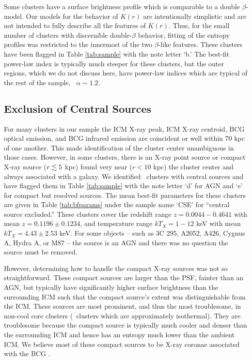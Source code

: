 \documentclass[12pt,preprint]{aastex}
\begin{document}
Some clusters have a surface brightness profile which is comparable to
a double $\beta$-model. Our models for the behavior of $K(r)$ are
intentionally simplistic and are not intended to fully describe all
the features of $K(r)$. Thus, for the small number of clusters with
discernible double-$\beta$ behavior, fitting of the entropy profiles
was restricted to the innermost of the two $\beta$-like
features. These clusters have been flagged in Table \ref{tab:sample}
with the note letter `b.' The best-fit power-law index is typically
much steeper for these clusters, but the outer regions, which we do
not discuss here, have power-law indices which are typical of the rest
of the sample, \ie\ $\alpha \sim 1.2$.


\subsection{Exclusion of Central Sources}
\label{sec:centsrc}

For many clusters in our sample the ICM X-ray peak, ICM X-ray
centroid, BCG optical emission, and BCG infrared emission are
coincident or well within 70 kpc of one another. This made
identification of the cluster center unambiguous in those
cases. However, in some clusters, there is an X-ray point source or
compact X-ray source ($r \lesssim 5$ kpc) found very near ($r < 10$ kpc)
the cluster center and always associated with a galaxy. We identified
\centsrcnum\ clusters with central sources and have flagged them in
Table \ref{tab:sample} with the note letter `d' for AGN and `e' for
compact but resolved sources. The mean best-fit parameters for these
clusters are given in Table \ref{tab:bfparams} under the sample name
`CSE' for ``central source excluded.'' These clusters cover the
redshift range $z = 0.0044-0.4641$ with mean $z = 0.1196 \pm 0.1234$,
and temperature range $kT_X = 1-12$ keV with mean $kT_X = 4.43 \pm
2.53$ keV. For some objects -- such as 3C 295, A2052, A426, Cygnus A,
Hydra A, or M87 -- the source is an AGN and there was no question the
source must be removed.

However, determining how to handle the compact X-ray sources was not
so straightforward. These compact sources are larger than the PSF,
fainter than an AGN, but typically have significantly higher surface
brightness than the surrounding ICM such that the compact source's
extent was distinguishable from the ICM. These sources are most
prominent, and thus the most troublesome, in non-cool core clusters
(\ie\ clusters which are approximately isothermal). They are
troublesome because the compact source is typically much cooler and
denser than the surrounding ICM and hence has an entropy much lower
than the ambient ICM. We believe most of these compact sources to be
X-ray coronae associated with the BCG \citep[see][for discussion of
  BCG coronae]{coronae}.
\end{document}
